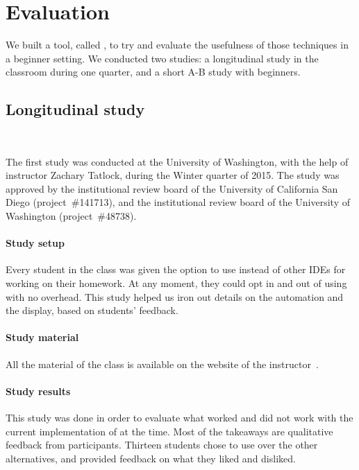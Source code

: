 \section{Evaluation}

We built a tool, called \PeaCoq{}, to try and evaluate the usefulness of those
techniques in a beginner setting.  We conducted two studies: a longitudinal
study in the classroom during one quarter, and a short A-B study with beginners.

\subsection{Longitudinal study}~\label{peacoq-longitudinal-study}

The first study was conducted at the University of Washington, with the help of
instructor Zachary Tatlock, during the Winter quarter of 2015.  The study was
approved by the institutional review board of the University of California San
Diego (project~\#141713), and the institutional review board of the University
of Washington (project~\#48738).

\paragraph{Study setup}

Every student in the class was given the option to use \PeaCoq{} instead of
other IDEs for working on their homework.  At any moment, they could opt in and
out of using \PeaCoq{} with no overhead.  This study helped us iron out details
on the automation and the display, based on students' feedback.

\paragraph{Study material}

All the material of the class is available on the website of the
instructor~\footnotemark{}.


\paragraph{Study results}

This study was done in order to evaluate what worked and did not work with the
current implementation of \PeaCoq{} at the time.  Most of the takeaways are
qualitative feedback from participants.  Thirteen students chose to use
\PeaCoq{} over the other alternatives, and provided feedback on what they liked
and disliked.

